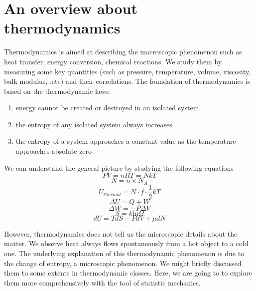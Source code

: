 
\section{An overview about thermodynamics} %
Thermodynamics is aimed at describing the macroscopic phenomenon such as heat transfer, energy conversion, chemical reactions.
We study them by measuring some key quantities (such as pressure, temperature, volume, viscosity, bulk modulus, .etc) and their correlations.
The foundation of thermodynamics is based on the thermodynamic laws:
\begin{enumerate}
	\item energy cannot be created or destroyed in an isolated system.
	\item the entropy of any isolated system always increases
	\item the entropy of a system approaches a constant value as the temperature approaches absolute zero
\end{enumerate}	

We can understand the general picture by studying the following equations
\begin{equation} \label{idealgas} PV = nRT = NkT \end{equation}
\begin{equation} \label{Avogadro} N = n \times N_A \end{equation}
\begin{equation} \label{eqpartition} U_{thermal} = N \cdot f \cdot \frac{1}{2}kT \end{equation}
\begin{equation} \label{1stlaw} \Delta{U} = Q + W \end{equation}
\begin{equation} \label{work3} \Delta W = - P \Delta{V} \end{equation}
\begin{equation} \label{entropy} S = k \text{ln}\Omega \end{equation}
\begin{equation} dU = TdS - PdV  + \mu dN\end{equation}

However, thermodynamics does not tell us the microscopic details about the matter. We observe heat always flows spontaneously from a hot object to a cold one. The underlying explanation of this thermodynamic phenomenon is due to the change of entropy, a microscopic phenomenon. We might briefly discussed them to some extents in thermodynamic classes. Here, we are going to to explore them more comprehensively with the tool of statistic mechanics.

